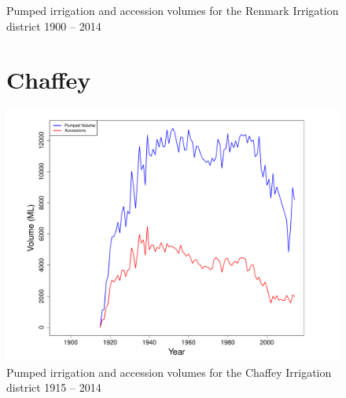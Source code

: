 \documentclass[a4paper, titlepage, 12pt]{article}\usepackage[]{graphicx}\usepackage[]{color}
\makeatletter
\def\maxwidth{ %
  \ifdim\Gin@nat@width>\linewidth
    \linewidth
  \else
    \Gin@nat@width
  \fi
}
\newenvironment{knitrout}{}{} %
\makeatother
\begin{document}
\begin{sffamily}
\begin{appendices}
\begin{figure}
\begin{knitrout}
\end{knitrout}
\caption{Pumped irrigation and accession volumes for the Renmark Irrigation district 1900 -- 2014}
\label{fig06}
\end{figure}

\begin{figure}
\section{Chaffey}
\begin{knitrout}
\color{fgcolor}
\includegraphics[width=\maxwidth]{../figures/Chaffey-1} 

\end{knitrout}
\caption{Pumped irrigation and accession volumes for the Chaffey Irrigation district 1915 -- 2014}
\label{fig07}
\end{figure}
\end{appendices}


\end{sffamily}
\end{document}

